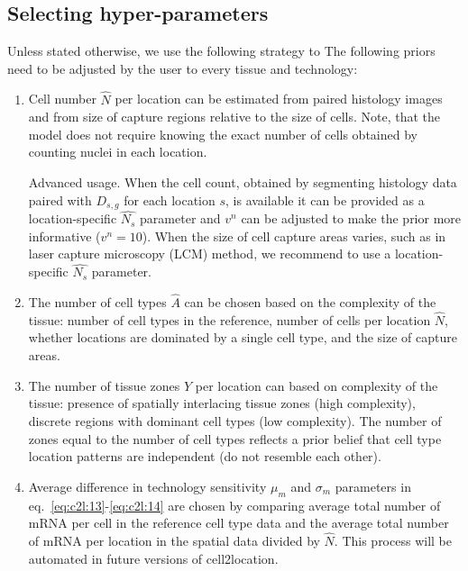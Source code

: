 \documentclass[11pt,a4paper]{article}
\begin{document}
\subsection{Selecting hyper-parameters} \label{hyper-parameters}

Unless stated otherwise, we use the following strategy to The following priors need to be adjusted by the user to every tissue and technology:
\begin{enumerate}
    \item Cell number $\hat{N}$ per location can be estimated from paired histology images and from size of capture regions relative to the size of cells. Note, that the model does not require knowing the exact number of cells obtained by counting nuclei in each location. 
    
    Advanced usage. When the cell count, obtained by segmenting histology data paired with $D_{s,g}$ for each location $s$, is available it can be provided as a location-specific $\hat{N_s}$ parameter and $v^{n}$ can be adjusted to make the prior more informative ($v^{n}=10$). When the size of cell capture areas varies, such as in laser capture microscopy (LCM) method, we recommend to use a location-specific $\hat{N_s}$ parameter.
    \item The number of cell types $\hat{A}$ can be chosen based on the complexity of the tissue: number of cell types in the reference, number of cells per location $\hat{N}$, whether locations are dominated by a single cell type, and the size of capture areas. 
    \item The number of tissue zones $\hat{Y}$ per location can based on complexity of the tissue: presence of spatially interlacing tissue zones (high complexity), discrete regions with dominant cell types (low complexity). The number of zones equal to the number of cell types reflects a prior belief that cell type location patterns are independent (do not resemble each other).
    \item Average difference in technology sensitivity $\mu_m$ and $\sigma_m$ parameters in eq.~\eqref{eq:c2l:13}-\eqref{eq:c2l:14} are chosen by comparing average total number of mRNA per cell in the reference cell type data and the average total number of mRNA per location in the spatial data divided by $\hat{N}$. This process will be automated in future versions of cell2location.
\end{enumerate}
\end{document}
